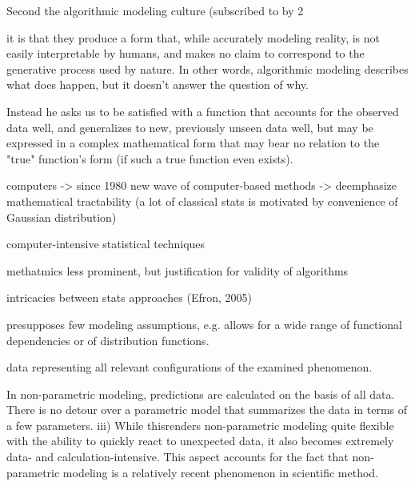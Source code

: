 \documentclass[authoryear,review,3p]{elsarticle}
\begin{document}
Second the algorithmic modeling culture (subscribed to by 2%

it is that they produce a form that, while accurately modeling reality, is not easily interpretable by humans, and makes no claim to correspond to the generative process used by nature. In other words, algorithmic modeling describes what does happen, but it doesn't answer the question of why.

Instead he asks us to be satisfied with a function that accounts for the observed data well, and generalizes to new, previously unseen data well, but may be expressed in a complex mathematical form that may bear no relation to the "true" function's form (if such a true function even exists).

computers -> since 1980 new wave of computer-based methods -> deemphasize mathematical tractability
(a lot of classical stats is motivated by convenience of Gaussian distribution)

computer-intensive statistical techniques

methatmics less prominent, but justification for validity of algorithms

intricacies between stats approaches (Efron, 2005)

presupposes few modeling assumptions, e.g. allows for a wide range of functional dependencies or of distribution functions.

data representing all relevant configurations of the examined phenomenon.

In non-parametric modeling, predictions are calculated on the basis of all data. There is no detour over a parametric model that summarizes the data in terms of a few parameters. iii) While thisrenders non-parametric modeling quite flexible with the ability to quickly react to unexpected data, it also becomes extremely data- and calculation-intensive. This aspect accounts for the fact that non-parametric modeling is a relatively recent phenomenon in scientific method.
\end{document}
